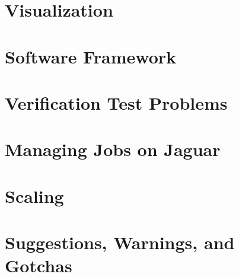 \documentclass[11pt]{book}
\begin{document}
\chapter{Visualization}


\chapter{Software Framework}



\chapter{Verification Test Problems}


\chapter{Managing Jobs on Jaguar}\label{Chap:Managing}




\chapter{Scaling}


\chapter{Suggestions, Warnings, and Gotchas}



\backmatter

\renewcommand\bibname{References}


\end{document}
